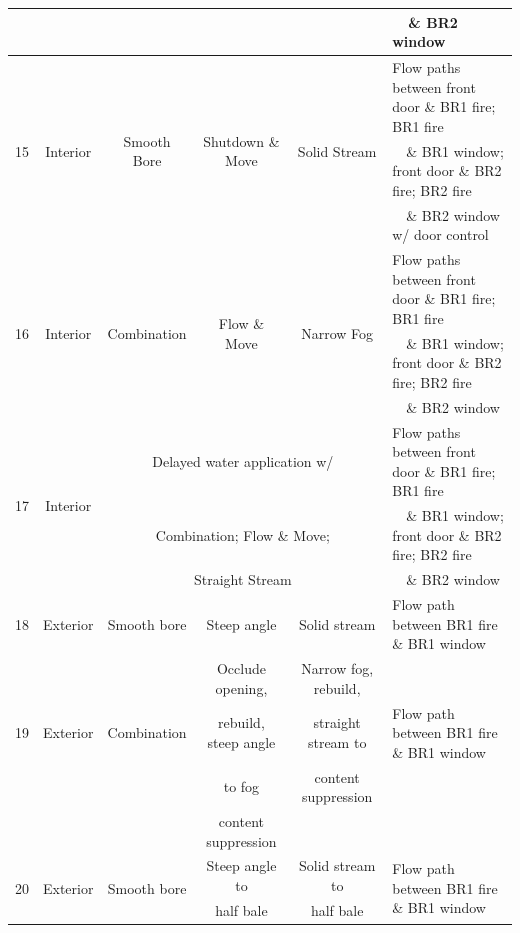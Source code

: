 \documentclass[12pt,oneside]{book}
\begin{document}
\begin{table}[H]
{\begin{tabular}{|c|c|c|c|c|l|}
					& 							& 								& 									& 									& ~~\& BR2 window \\
\hline
\multirow{3}{*}{15}	& \multirow{3}{*}{Interior} & \multirow{3}{*}{Smooth Bore} 	& \multirow{3}{*}{Shutdown \& Move}	& \multirow{3}{*}{Solid Stream} 	& Flow paths between front door \& BR1 fire; BR1 fire \\
					& 							& 								& 									& 									& ~~\& BR1 window; front door \& BR2 fire; BR2 fire	\\
					& 							& 								& 									& 									& ~~\& BR2 window w/ door control \\
\hline
\multirow{3}{*}{16}	& \multirow{3}{*}{Interior} & \multirow{3}{*}{Combination} 	& \multirow{3}{*}{Flow \& Move}		& \multirow{3}{*}{Narrow Fog} 		& Flow paths between front door \& BR1 fire; BR1 fire \\
					& 							& 								& 									& 									& ~~\& BR1 window; front door \& BR2 fire; BR2 fire	\\
					& 							& 								& 									& 									& ~~\& BR2 window \\
\hline
\multirow{3}{*}{17}	& \multirow{3}{*}{Interior} & \multicolumn{3}{c|}{Delayed water application w/}														& Flow paths between front door \& BR1 fire; BR1 fire \\
					& 							& \multicolumn{3}{c|}{Combination; Flow \& Move;}														& ~~\& BR1 window; front door \& BR2 fire; BR2 fire	\\
					& 							& \multicolumn{3}{c|}{Straight Stream}																	& ~~\& BR2 window \\
\hline \hline
18 					& Exterior 					& 	Smooth bore 				& Steep angle 				& 	Solid stream 			& 	Flow path between BR1 fire \& BR1 window \\
\hline
					&  							& 								& Occlude opening, 		 	&  	Narrow fog, rebuild, 		& 	\\
 		19			& 			Exterior		& 	Combination					& rebuild, steep angle   	&  	straight stream to  		& 	Flow path between BR1 fire \& BR1 window		\\
 					& 							& 								& to fog 					& 	content suppression 					& 		\\
					&							&								& content suppression 		& 								 	&							\\
\hline
\multirow{2}{*}{20}	& \multirow{2}{*}{Exterior} & \multirow{2}{*}{Smooth bore} 	& Steep angle to 			&  	Solid stream to 	& 	\multirow{2}{*}{Flow path between BR1 fire \& BR1 window} 	\\
 					& 							& 								& half bale 	&  	half bale  		& 			\\

\end{tabular}}
\end{table}
\end{document}
